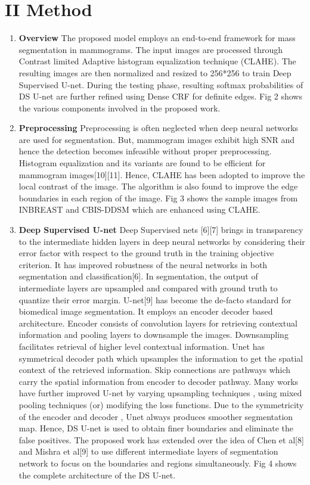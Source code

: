 \documentclass[review]{elsarticle}
\newcommand{\<}{${<}$}
\begin{document}
\section{II Method }
\begin{enumerate}
\item \textbf {Overview} \newline
The proposed model employs an end-to-end framework for mass segmentation in mammograms.  The input images are processed through Contrast limited Adaptive histogram equalization technique (CLAHE).  The resulting images are then normalized and resized to 256*256 to train Deep Supervised U-net. During the testing phase, resulting softmax probabilities of DS U-net are further refined using Dense CRF for  definite edges. Fig 2 shows the various components involved in the proposed work.

\item \textbf {Preprocessing} \newline
Preprocessing is often neglected when deep neural networks are used for segmentation. But, mammogram images exhibit high SNR and hence the detection becomes infeasible without proper preprocessing. Histogram equalization and its variants are found to be efficient for mammogram images[10][11]. Hence, CLAHE has been adopted to improve the local contrast of the image. The algorithm is also found to improve the edge boundaries in each region of the image. Fig 3 shows the sample images from INBREAST and CBIS-DDSM which are enhanced using CLAHE.

\item \textbf {Deep Supervised U-net} \newline
Deep Supervised nets [6][7] brings in transparency to the intermediate hidden layers in deep neural networks by considering their error factor with respect to the ground truth in the training objective criterion. It has improved robustness of the neural networks in both segmentation and classification[6]. In segmentation, the output of intermediate layers are upsampled and compared with ground truth to quantize their error margin.  U-net[9] has become the de-facto standard for biomedical image segmentation. It employs an encoder decoder based architecture. Encoder consists of convolution layers for retrieving contextual information and pooling layers to downsample the images. Downsampling facilitates retrieval of higher level contextual information. Unet has symmetrical decoder path which upsamples the information to get the spatial context of the retrieved information. Skip connections are pathways which carry the spatial information from encoder to decoder pathway. Many works have further improved U-net by varying upsampling techniques , using mixed pooling techniques (or) modifying the loss functions. Due to the symmetricity of the encoder and decoder , Unet always produces smoother segmentation map. Hence, DS U-net is used to obtain finer boundaries and eliminate the false positives. The proposed work has extended over the idea of Chen et al[8] and Mishra et al[9] to use different intermediate layers of segmentation network to focus on the boundaries and regions simultaneously. Fig 4 shows the complete architecture of the DS U-net.


\end{enumerate}
\end{document}

